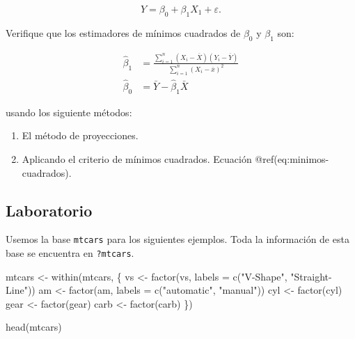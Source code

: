 \documentclass[
  12pt,
]{book}
\newenvironment{Shaded}{\begin{snugshade}}{\end{snugshade}}
\newcommand{\AttributeTok}[1]{\textcolor[rgb]{0.77,0.63,0.00}{#1}}
\newcommand{\FunctionTok}[1]{\textcolor[rgb]{0.00,0.00,0.00}{#1}}
\newcommand{\NormalTok}[1]{#1}
\newcommand{\OtherTok}[1]{\textcolor[rgb]{0.56,0.35,0.01}{#1}}
\newcommand{\StringTok}[1]{\textcolor[rgb]{0.31,0.60,0.02}{#1}}
\providecommand{\tightlist}{%
  \setlength{\itemsep}{0pt}\setlength{\parskip}{0pt}}
\begin{document}
\begin{equation*}
Y = \beta_{0} + \beta_{1}X_{1}+\varepsilon.
\end{equation*}

Verifique que los estimadores de mínimos cuadrados de \(\beta_{0}\) y
\(\beta_{1}\) son:

\begin{align*}
\hat{\beta}_{1}&= \frac{\sum_{i=1}^{n}\left(X_{i}-\overline{X}\right)\left(Y_{i}-\overline{Y}\right)}{\sum_{i=1}^{n}\left(X_{i}-\overline{x}\right)^{2}} \\ 
\hat{\beta}_{0}&= \bar{Y}-\widehat{\beta}_{1} \bar{X}
\end{align*}

usando los siguiente métodos:

\begin{enumerate}
\def\labelenumi{\arabic{enumi}.}
\tightlist
\item
  El método de proyecciones.
\item
  Aplicando el criterio de mínimos cuadrados. Ecuación
  @ref(eq:minimos-cuadrados).
\end{enumerate}

\hypertarget{laboratorio-1}{%
\subsection{Laboratorio}\label{laboratorio-1}}

Usemos la base \texttt{mtcars} para los siguientes ejemplos. Toda la
información de esta base se encuentra en \texttt{?mtcars}.

\begin{Shaded}
\begin{Highlighting}[]
\NormalTok{mtcars }\OtherTok{\textless{}{-}} \FunctionTok{within}\NormalTok{(mtcars, \{}
\NormalTok{    vs }\OtherTok{\textless{}{-}} \FunctionTok{factor}\NormalTok{(vs, }\AttributeTok{labels =} \FunctionTok{c}\NormalTok{(}\StringTok{"V{-}Shape"}\NormalTok{, }\StringTok{"Straight{-}Line"}\NormalTok{))}
\NormalTok{    am }\OtherTok{\textless{}{-}} \FunctionTok{factor}\NormalTok{(am, }\AttributeTok{labels =} \FunctionTok{c}\NormalTok{(}\StringTok{"automatic"}\NormalTok{, }\StringTok{"manual"}\NormalTok{))}
\NormalTok{    cyl }\OtherTok{\textless{}{-}} \FunctionTok{factor}\NormalTok{(cyl)}
\NormalTok{    gear }\OtherTok{\textless{}{-}} \FunctionTok{factor}\NormalTok{(gear)}
\NormalTok{    carb }\OtherTok{\textless{}{-}} \FunctionTok{factor}\NormalTok{(carb)}
\NormalTok{\})}

\FunctionTok{head}\NormalTok{(mtcars)}
\end{Highlighting}
\end{Shaded}
\end{document}
